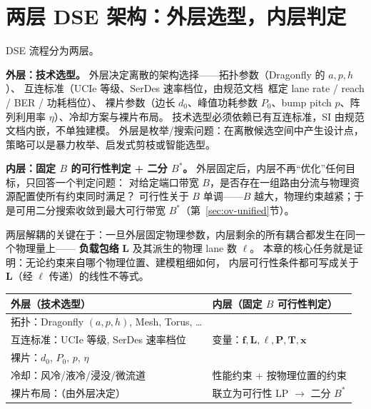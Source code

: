 \section{两层 DSE 架构：外层选型，内层判定}\label{sec:ov-twolayer}

DSE 流程分为两层。

\textbf{外层：技术选型。}
外层决定离散的架构选择——拓扑参数（Dragonfly 的 $a,p,h$）、
互连标准（UCIe 等级、SerDes 速率档位，由规范文档~\cite{ucie2.0-2024,oif-cei-5.1}框定 lane rate / reach / BER / 功耗档位）、
裸片参数（边长 $d_0$、峰值功耗参数 $P_0$、bump pitch $p$、阵列利用率 $\eta$）、冷却方案与裸片布局。
技术选型必须依赖已有互连标准，SI 由规范文档内嵌，不单独建模。
外层是枚举/搜索问题：在离散候选空间中产生设计点，策略可以是暴力枚举、启发式剪枝或智能选型。

\textbf{内层：固定 $B$ 的可行性判定 + 二分 $B^*$。}
外层固定后，内层不再``优化''任何目标，只回答一个判定问题：
对给定端口带宽 $B$，是否存在一组路由分流与物理资源配置使所有约束同时满足？
可行性关于 $B$ 单调——$B$ 越大，物理约束越紧；于是可用二分搜索收敛到最大可行带宽 $B^*$（第~\ref{sec:ov-unified}节）。

两层解耦的关键在于：一旦外层固定物理参数，内层剩余的所有耦合都发生在同一个物理量上——
\textbf{负载包络} $\mathbf{L}$ 及其派生的物理 lane 数 $\boldsymbol{\ell}$。
本章的核心任务就是证明：无论约束来自哪个物理位置、建模粗细如何，
内层可行性条件都可写成关于 $\mathbf{L}$（经 $\boldsymbol{\ell}$ 传递）的线性不等式。

\begin{center}
\begin{tabular}{l|l}
\hline
\textbf{外层（技术选型）} & \textbf{内层（固定 $B$ 可行性判定）} \\
\hline
拓扑：Dragonfly $(a,p,h)$, Mesh, Torus, \dots & \\
互连标准：UCIe 等级, SerDes 速率档位 & 变量：$\mathbf{f}, \mathbf{L}, \boldsymbol{\ell}, \mathbf{P}, \mathbf{T}, \mathbf{x}$ \\
裸片：$d_0$, $P_0$, $p$, $\eta$ & \\
冷却：风冷/液冷/浸没/微流道 & 性能约束 + 按物理位置的约束 \\
裸片布局：（由外层决定） & 联立为可行性 LP $\to$ 二分 $B^*$ \\
\hline
\end{tabular}
\end{center}
